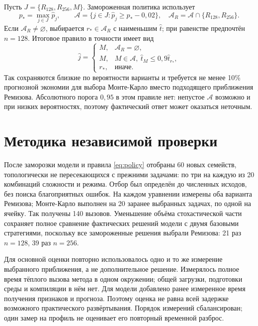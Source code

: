 Пусть $J=\{R_{128},R_{256},M\}$. Замороженная политика использует
\begin{equation}\label{eq:eligible}
p_* =\max_{j\in J}\widehat p_j,\qquad
\mathcal A=\{j\in J:\widehat p_j\ge p_*-0{,}02\},\quad
\mathcal A_R=\mathcal A\cap\{R_{128},R_{256}\}.
\end{equation}
Если $\mathcal A_R\ne\varnothing$, выбирается $r_*\in\mathcal A_R$ с наименьшим $\widehat t$; при равенстве предпочтён $n=128$. Итоговое правило в точности имеет вид
\begin{equation}\label{eq:policy}
\widehat j=\begin{cases}M,&\mathcal A_R=\varnothing,\\
M,&M\in\mathcal A,\ \widehat t_M\le0{,}9\widehat t_{r_*},\\
r_*,&\text{иначе}.\end{cases}
\end{equation}
Так сохраняются близкие по вероятности варианты и требуется не менее 10\% прогнозной экономии для выбора Монте-Карло вместо подходящего приближения Ремизова. Абсолютного порога $0{,}95$ в этом правиле нет: непустое $\mathcal A$ возможно и при низких вероятностях, поэтому фактический ответ может оказаться неточным.

\clearpage
{}
\section{Методика независимой проверки}
После заморозки модели и правила \eqref{eq:policy} отобраны 60 новых семейств, топологически не пересекающихся с прежними задачами: по три на каждую из 20 комбинаций сложности и режима. Отбор был определён до численных исходов, без поиска благоприятных ошибок. На каждом уравнении измерены оба варианта Ремизова; Монте-Карло выполнен на 20 заранее выбранных задачах, по одной на ячейку. Так получены 140 вызовов. Уменьшение объёма стохастической части сохраняет полное сравнение фактических решений модели с двумя базовыми стратегиями, поскольку все замороженные решения выбрали Ремизова: 21 раз $n=128$, 39 раз $n=256$.

Для основной оценки повторно использовалось одно и то же измерение выбранного приближения, а не дополнительное решение. Измерялось полное время тёплого вызова метода в одном окружении; общей загрузки, подготовки среды и компиляции в нём нет. Для модели добавлено ранее измеренное время получения признаков и прогноза. Поэтому оценка не равна всей задержке возможного практического развёртывания. Порядок измерений сбалансирован; один замер на профиль не оценивает его повторный временной разброс.

